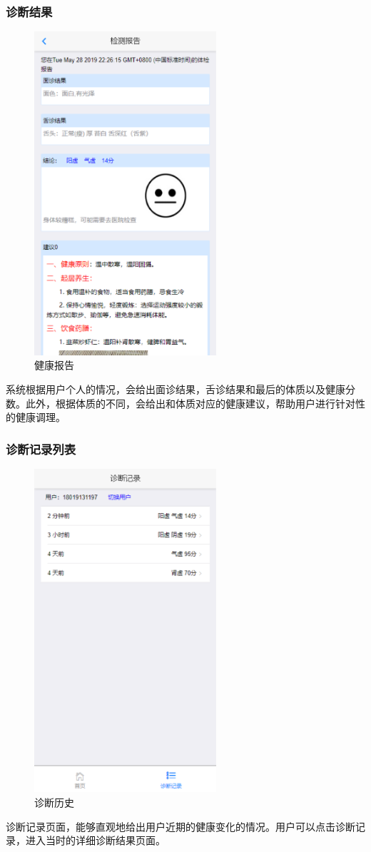 \subsubsection{诊断结果}
\begin{figure}[ht]
    \centering
    \includegraphics[height=12cm]{images/report.png}
    \caption{健康报告}
    \label{fig:report}
\end{figure}
系统根据用户个人的情况，会给出面诊结果，舌诊结果和最后的体质以及健康分数。此外，根据体质的不同，会给出和体质对应的健康建议，帮助用户进行针对性的健康调理。

\subsubsection{诊断记录列表}
\begin{figure}[ht]
    \centering
    \includegraphics[height=12cm]{images/history.png}
    \caption{诊断历史}
    \label{fig:history}
\end{figure}
诊断记录页面，能够直观地给出用户近期的健康变化的情况。用户可以点击诊断记录，进入当时的详细诊断结果页面。

